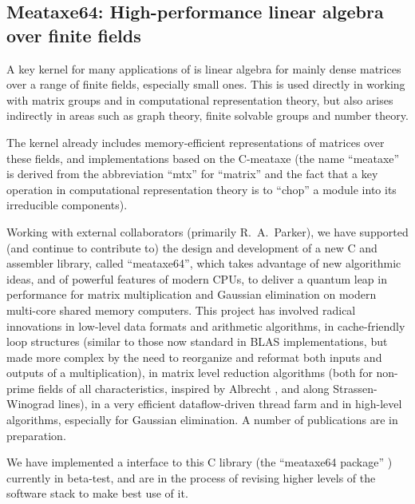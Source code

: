 


\subsection{Meataxe64: High-performance linear algebra over finite fields}\label{meataxe64}

A key kernel for many applications of \GAP is linear algebra for
mainly dense matrices over
a range of finite fields, especially small ones. This is used directly in working with
matrix groups and in computational representation theory, but also
arises indirectly in areas such as graph theory, finite solvable
groups and number theory. 

The \GAP kernel already includes memory-efficient
representations of matrices over these fields, and implementations
based on the C-meataxe (the name ``meataxe'' is derived from the
abbreviation ``mtx'' for ``matrix'' and the fact that a key operation
in computational representation theory is to ``chop'' a module into
its irreducible components).

Working with external collaborators (primarily R.~A.~Parker), we have
supported (and continue to contribute to) the design and development
of a new C and assembler library, called ``meataxe64'', which takes
advantage of new algorithmic ideas, and of powerful features of modern
CPUs, to deliver a quantum leap in performance for matrix
multiplication and Gaussian elimination on modern multi-core shared
memory computers. This project has involved radical innovations in
low-level data formats and arithmetic algorithms, in cache-friendly
loop structures (similar to those now standard in BLAS implementations,
but made more complex by the need to reorganize and reformat both
inputs and outputs of a multiplication), in matrix level reduction
algorithms (both for non-prime fields of all characteristics, inspired
by Albrecht \cite{m4rie}, and along Strassen-Winograd lines), in a
very efficient dataflow-driven thread farm and in high-level
algorithms, especially for Gaussian elimination. A number of
publications are in preparation.

We have implemented a \GAP interface to this C library (the
``meataxe64 \GAP package'' \cite{meataxe64}) currently in beta-test,
and are in the process of revising higher levels of the software stack
to make best use of it.

